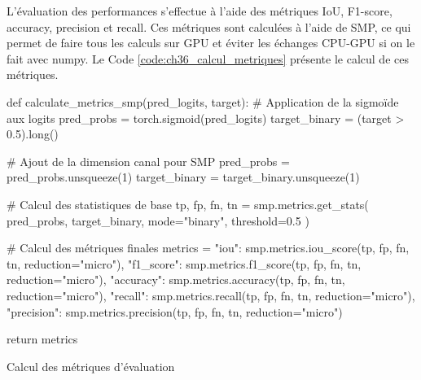 L'évaluation des performances s'effectue à l'aide des métriques IoU, F1-score, accuracy, precision et recall. Ces métriques sont calculées à l'aide de SMP, ce qui permet de faire tous les calculs sur GPU et éviter les échanges CPU-GPU si on le fait avec numpy. Le Code \ref{code:ch36_calcul_metriques} présente le calcul de ces métriques.

\begin{code}[H]
    \begin{pythoncode}
    def calculate_metrics_smp(pred_logits, target):
        # Application de la sigmoïde aux logits
        pred_probs = torch.sigmoid(pred_logits)
        target_binary = (target > 0.5).long()
        
        # Ajout de la dimension canal pour SMP
        pred_probs = pred_probs.unsqueeze(1)
        target_binary = target_binary.unsqueeze(1)
        
        # Calcul des statistiques de base
        tp, fp, fn, tn = smp.metrics.get_stats(
            pred_probs, target_binary,
            mode="binary", threshold=0.5
        )
        
        # Calcul des métriques finales
        metrics = {
            "iou": smp.metrics.iou_score(tp, fp, fn, tn, reduction="micro"),
            "f1_score": smp.metrics.f1_score(tp, fp, fn, tn, reduction="micro"),
            "accuracy": smp.metrics.accuracy(tp, fp, fn, tn, reduction="micro"),
            "recall": smp.metrics.recall(tp, fp, fn, tn, reduction="micro"),
            "precision": smp.metrics.precision(tp, fp, fn, tn, reduction="micro")
        }
        
        return metrics
    \end{pythoncode}
    \caption{Calcul des métriques d'évaluation}
    \label{code:ch36_calcul_metriques}
\end{code}

